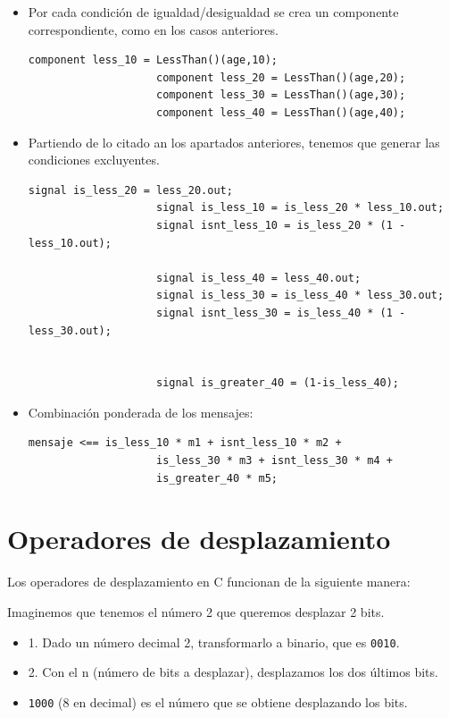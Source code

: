 \documentclass[a4paper,10pt]{article}
\begin{document}
			
			\begin{itemize}
				\item Por cada condición de igualdad/desigualdad se crea un componente correspondiente, como en los casos anteriores.
				
				\begin{lstlisting}[language=Circom]
					component less_10 = LessThan()(age,10);
					component less_20 = LessThan()(age,20);
					component less_30 = LessThan()(age,30);
					component less_40 = LessThan()(age,40);
				\end{lstlisting}
				
				\item Partiendo de lo citado an los apartados anteriores, tenemos que generar las condiciones excluyentes.
				
				\begin{lstlisting}[language=Circom]
					signal is_less_20 = less_20.out;
					signal is_less_10 = is_less_20 * less_10.out;
					signal isnt_less_10 = is_less_20 * (1 - less_10.out);
					
					signal is_less_40 = less_40.out;
					signal is_less_30 = is_less_40 * less_30.out;
					signal isnt_less_30 = is_less_40 * (1 - less_30.out);
					
					
					signal is_greater_40 = (1-is_less_40);
				\end{lstlisting}
				
				\item Combinación ponderada de los mensajes:
				\begin{lstlisting}[language=Circom]
					mensaje <== is_less_10 * m1 + isnt_less_10 * m2 +
					is_less_30 * m3 + isnt_less_30 * m4 +
					is_greater_40 * m5;
				\end{lstlisting}
			\end{itemize}
		
		\section{Operadores de desplazamiento}
		
		
		\noindent Los operadores de desplazamiento en C funcionan de la siguiente manera:
		
		\vspace{0.3cm}
		
		\noindent Imaginemos que tenemos el número 2 que queremos desplazar 2 bits.
		
		\begin{itemize}
			\item 1. Dado un número decimal 2, transformarlo a binario, que es \texttt{0010}.
			\item 2. Con el n (número de bits a desplazar), desplazamos los dos últimos bits.
			\item \texttt{1000} (8 en decimal) es el número que se obtiene desplazando los bits.
		\end{itemize}
		
\end{document}
